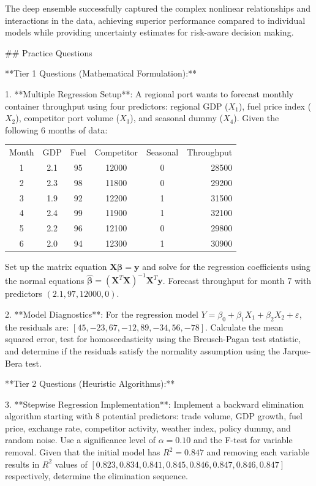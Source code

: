\documentclass{article}
\begin{document}
The deep ensemble successfully captured the complex nonlinear relationships and interactions in the data, achieving superior performance compared to individual models while providing uncertainty estimates for risk-aware decision making.

## Practice Questions

**Tier 1 Questions (Mathematical Formulation):**

1. **Multiple Regression Setup**: A regional port wants to forecast monthly container throughput using four predictors: regional GDP ($X_1$), fuel price index ($X_2$), competitor port volume ($X_3$), and seasonal dummy ($X_4$). Given the following 6 months of data:

\begin{center}
\begin{tabular}{cccccr}
Month & GDP & Fuel & Competitor & Seasonal & Throughput \\
1 & 2.1 & 95 & 12000 & 0 & 28500 \\
2 & 2.3 & 98 & 11800 & 0 & 29200 \\
3 & 1.9 & 92 & 12200 & 1 & 31500 \\
4 & 2.4 & 99 & 11900 & 1 & 32100 \\
5 & 2.2 & 96 & 12100 & 0 & 29800 \\
6 & 2.0 & 94 & 12300 & 1 & 30900 \\
\end{tabular}
\end{center}

Set up the matrix equation $\mathbf{X}\boldsymbol{\beta} = \mathbf{y}$ and solve for the regression coefficients using the normal equations $\hat{\boldsymbol{\beta}} = (\mathbf{X}^T\mathbf{X})^{-1}\mathbf{X}^T\mathbf{y}$. Forecast throughput for month 7 with predictors $(2.1, 97, 12000, 0)$.

2. **Model Diagnostics**: For the regression model $Y = \beta_0 + \beta_1 X_1 + \beta_2 X_2 + \varepsilon$, the residuals are: $[45, -23, 67, -12, 89, -34, 56, -78]$. Calculate the mean squared error, test for homoscedasticity using the Breusch-Pagan test statistic, and determine if the residuals satisfy the normality assumption using the Jarque-Bera test.

**Tier 2 Questions (Heuristic Algorithms):**

3. **Stepwise Regression Implementation**: Implement a backward elimination algorithm starting with 8 potential predictors: trade volume, GDP growth, fuel price, exchange rate, competitor activity, weather index, policy dummy, and random noise. Use a significance level of $\alpha = 0.10$ and the F-test for variable removal. Given that the initial model has $R^2 = 0.847$ and removing each variable results in $R^2$ values of $[0.823, 0.834, 0.841, 0.845, 0.846, 0.847, 0.846, 0.847]$ respectively, determine the elimination sequence.
\end{document}
